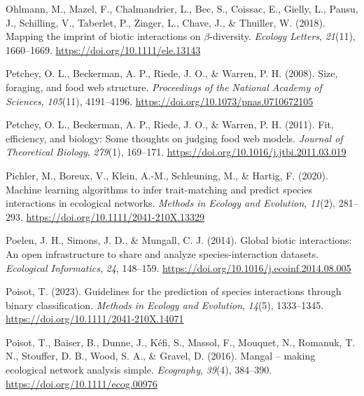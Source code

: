 \documentclass[
]{article}
\newlength{\cslhangindent}
\newenvironment{CSLReferences}[2] %
 {\begin{list}{}{%
  \setlength{\itemindent}{0pt}
  \setlength{\leftmargin}{0pt}
  \setlength{\parsep}{0pt}
  \ifodd #1
   \setlength{\leftmargin}{\cslhangindent}
   \setlength{\itemindent}{-1\cslhangindent}
  \fi
  \setlength{\itemsep}{#2\baselineskip}}}
 {\end{list}}
\begin{document}
\begin{CSLReferences}{1}{0}
Ohlmann, M., Mazel, F., Chalmandrier, L., Bec, S., Coissac, E., Gielly,
L., Pansu, J., Schilling, V., Taberlet, P., Zinger, L., Chave, J., \&
Thuiller, W. (2018). Mapping the imprint of biotic interactions on
{\(\beta\)}-diversity. \emph{Ecology Letters}, \emph{21}(11),
1660--1669. \url{https://doi.org/10.1111/ele.13143}

Petchey, O. L., Beckerman, A. P., Riede, J. O., \& Warren, P. H. (2008).
Size, foraging, and food web structure. \emph{Proceedings of the
National Academy of Sciences}, \emph{105}(11), 4191--4196.
\url{https://doi.org/10.1073/pnas.0710672105}

Petchey, O. L., Beckerman, A. P., Riede, J. O., \& Warren, P. H. (2011).
Fit, efficiency, and biology: {Some} thoughts on judging food web
models. \emph{Journal of Theoretical Biology}, \emph{279}(1), 169--171.
\url{https://doi.org/10.1016/j.jtbi.2011.03.019}

Pichler, M., Boreux, V., Klein, A.-M., Schleuning, M., \& Hartig, F.
(2020). Machine learning algorithms to infer trait-matching and predict
species interactions in ecological networks. \emph{Methods in Ecology
and Evolution}, \emph{11}(2), 281--293.
\url{https://doi.org/10.1111/2041-210X.13329}

Poelen, J. H., Simons, J. D., \& Mungall, C. J. (2014). Global biotic
interactions: {An} open infrastructure to share and analyze
species-interaction datasets. \emph{Ecological Informatics}, \emph{24},
148--159. \url{https://doi.org/10.1016/j.ecoinf.2014.08.005}

Poisot, T. (2023). Guidelines for the prediction of species interactions
through binary classification. \emph{Methods in Ecology and Evolution},
\emph{14}(5), 1333--1345. \url{https://doi.org/10.1111/2041-210X.14071}

Poisot, T., Baiser, B., Dunne, J., Kéfi, S., Massol, F., Mouquet, N.,
Romanuk, T. N., Stouffer, D. B., Wood, S. A., \& Gravel, D. (2016).
Mangal -- making ecological network analysis simple. \emph{Ecography},
\emph{39}(4), 384--390. \url{https://doi.org/10.1111/ecog.00976}


\end{CSLReferences}
\end{document}
